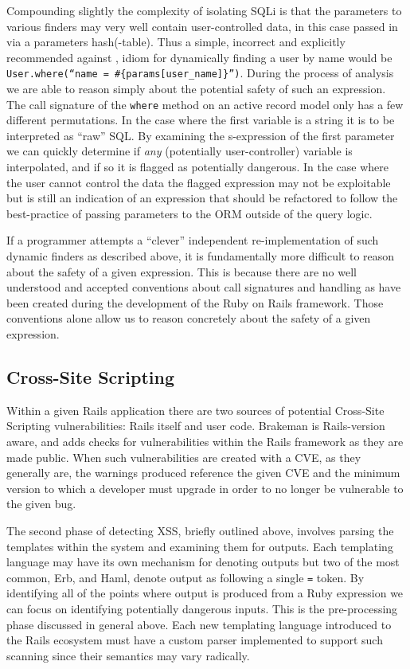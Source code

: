 \documentclass[conference]{IEEEtran}
\begin{document}
Compounding slightly the complexity of isolating SQLi is that the parameters to various
finders may very well contain user-controlled data, in this case passed in via a
parameters hash(-table).  Thus a simple, incorrect and explicitly recommended against
\cite{rails_security}, idiom for dynamically
finding a user by name would be \texttt{User.where(``name~=~\#\{params[user\_name]\}'')}.
During the process of analysis we are able to reason simply about the
potential safety of such an expression.  The call signature of the
\texttt{where} method on an active record model only has a few different
permutations.  In the case where the first variable is a string it is to be
interpreted as ``raw'' SQL.  By examining the s-expression of the first
parameter we can quickly determine if \emph{any} (potentially user-controller)
variable is interpolated, and if so it is flagged as potentially dangerous.  In
the case where the user cannot control the data the flagged expression may not
be exploitable but is still an indication of an expression that should be
refactored to follow the best-practice of passing parameters to the ORM outside
of the query logic\cite{rails_security_sqli}.

If a programmer attempts a ``clever'' independent re-implementation of such
dynamic finders as described above, it is fundamentally more difficult to reason
about the safety of a given expression.  This is because there are no well understood and
accepted conventions about call signatures and handling as have been created during the
development of the Ruby on Rails framework.  Those conventions alone allow us to reason
concretely about the safety of a given expression.

\subsection{Cross-Site Scripting}

Within a given Rails application there are two sources of potential Cross-Site
Scripting vulnerabilities: Rails itself and user code.  Brakeman is
Rails-version aware, and adds checks for vulnerabilities within the Rails
framework as they are made public.  When such vulnerabilities are created with a
CVE, as they generally are, the warnings produced reference the given CVE and
the minimum version to which a developer must upgrade in order to no longer be
vulnerable to the given bug.

The second phase of detecting XSS, briefly outlined above, involves parsing the
templates within the system and examining them for outputs.  Each templating
language may have its own mechanism for denoting outputs but two of the most
common, Erb, and Haml, denote output as following a single \texttt{=} token.  By
identifying all of the points where output is produced from a Ruby expression we
can focus on identifying potentially dangerous inputs.  This is the
pre-processing phase discussed in general above.  Each new templating language
introduced to the Rails ecosystem must have a custom parser implemented to
support such scanning since their semantics may vary radically.
\end{document}
